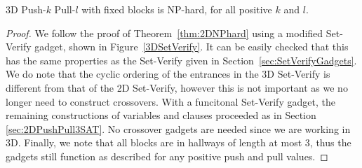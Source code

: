 \begin{theorem}
3D Push-$k$ Pull-$l$ with fixed blocks is NP-hard, for all positive $k$ and $l$.
\end{theorem}
\begin{proof}
We follow the proof of Theorem~\ref{thm:2DNPhard} using a modified Set-Verify gadget, shown in Figure~\ref{3DSetVerify}.  It can be easily checked that this has the same properties as the Set-Verify given in Section~\ref{sec:SetVerifyGadgets}. We do note that the cyclic ordering of the entrances in the 3D Set-Verify is different from that of the 2D Set-Verify, however this is not important as we no longer need to construct crossovers. With a funcitonal Set-Verify gadget, the remaining constructions of variables and clauses proceeded as in Section \ref{sec:2DPushPull3SAT}. No crossover gadgets are needed since we are working in 3D. Finally, we note that all blocks are in hallways of length at most 3, thus the gadgets still function as described for any positive push and pull values.


\end{proof}





